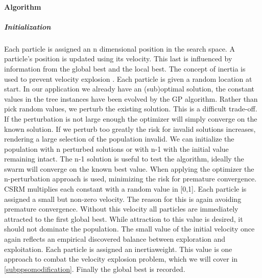 \paragraph{Algorithm}
\subparagraph{Initialization}
Each particle is assigned an n dimensional position in the search space. A particle's position is updated using its velocity. This last is influenced by information from the global best and the local best. The concept of inertia is used to prevent velocity explosion \cite{PSOExplosion}.
Each particle is given a random location at start. In our application we already have an (sub)optimal solution, the constant values in the tree instances have been evolved by the GP algorithm. Rather than pick random values, we perturb the existing solution. This is a difficult trade-off. If the perturbation is not large enough the optimizer will simply converge on the known solution. If we perturb too greatly the risk for invalid solutions increases, rendering a large selection of the population invalid. We can initialize the population with n perturbed solutions or with n-1 with the initial value remaining intact. The n-1 solution is useful to test the algorithm, ideally the swarm will converge on the known best value. When applying the optimizer the n-perturbation approach is used, minimizing the risk for premature convergence.
CSRM multiplies each constant with a random value in [0,1].
Each particle is assigned a small but non-zero velocity. The reason for this is again avoiding premature convergence. Without this velocity all particles are immediately attracted to the first global best. While attraction to this value is desired, it should not dominate the population. The small value of the initial velocity once again reflects an empirical discovered balance between exploration and exploitation.
Each particle is assigned an inertiaweight.
This value is one approach to combat the velocity explosion problem, which we will cover in \ref{subppsomodification}. 
Finally the global best is recorded. 



